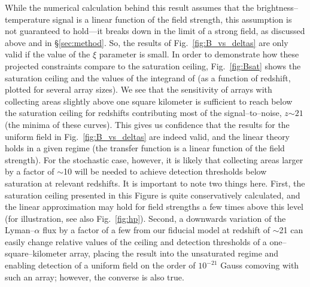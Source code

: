 While the numerical calculation behind this result assumes that the brightness--temperature signal is a linear function of the field strength, this assumption is not guaranteed to hold---it breaks down in the limit of a strong field, as discussed above and in \S\ref{sec:method}. So, the results of Fig.~\ref{fig:B_vs_deltas} are only valid if the value of the $\xi$ parameter is small. In order to demonstrate how these projected constraints compare to the saturation ceiling, Fig.~\ref{fig:Bsat} shows the saturation ceiling and the values of the integrand of \eq{\ref{eq:fisher_patch}} (as a function of redshift, plotted for several array sizes). We see that the sensitivity of arrays with collecting areas slightly above one square kilometer is sufficient to reach below the saturation ceiling for redshifts contributing most of the signal--to--noise, $z$$\sim$$21$ (the minima of these curves). This gives us confidence that the results for the uniform field in Fig.~\ref{fig:B_vs_deltas} are indeed valid, and the linear theory holds in a given regime (the transfer function is a linear function of the field strength). For the stochastic case, however, it is likely that collecting areas larger by a factor of $\sim$10 will be needed to achieve detection thresholds below saturation at relevant redshifts. It is important to note two things here. First, the saturation ceiling presented in this Figure is quite conservatively calculated, and the linear approximation may hold for field strengths a few times above this level (for illustration, see also Fig.~\ref{fig:hp}). Second, a downwards variation of the Lyman--$\alpha$ flux by a factor of a few from our fiducial model at redshift of $\sim$21 can easily change relative values of the ceiling and detection thresholds of a one--square--kilometer array, placing the result into the unsaturated regime and enabling detection of a uniform field on the order of $10^{-21}$ Gauss comoving with such an array; however, the converse is also true. 
